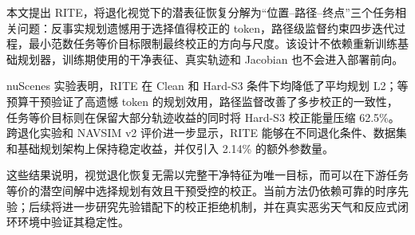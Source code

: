 \documentclass[letterpaper,10pt,conference]{ieeeconf}
\begin{document}
本文提出 RITE，将退化视觉下的潜表征恢复分解为“位置--路径--终点”三个任务相关问题：反事实规划遗憾用于选择值得校正的 token，路径级监督约束四步迭代过程，最小范数任务等价目标限制最终校正的方向与尺度。该设计不依赖重新训练基础规划器，训练期使用的干净表征、真实轨迹和 Jacobian 也不会进入部署前向。

nuScenes 实验表明，RITE 在 Clean 和 Hard-S3 条件下均降低了平均规划 L2；等预算干预验证了高遗憾 token 的规划效用，路径监督改善了多步校正的一致性，任务等价目标则在保留大部分轨迹收益的同时将 Hard-S3 校正能量压缩 62.5\%。跨退化实验和 NAVSIM v2 评价进一步显示，RITE 能够在不同退化条件、数据集和基础规划架构上保持稳定收益，并仅引入 2.14\% 的额外参数量。

这些结果说明，视觉退化恢复无需以完整干净特征为唯一目标，而可以在下游任务等价的潜空间解中选择规划有效且干预受控的校正。当前方法仍依赖可靠的时序先验；后续将进一步研究先验错配下的校正拒绝机制，并在真实恶劣天气和反应式闭环环境中验证其稳定性。



\end{document}
